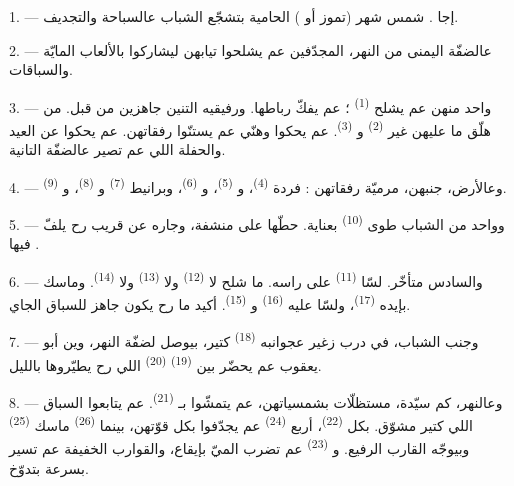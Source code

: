 \VUsaut{4.0mm}
\VUsaut{3.0mm}

\VUsaut{2.4mm}

\VUsaut{3.0mm}

1. --- إجا . شمس شهر  (تموز أو
) الحامية بتشجّع الشباب عالسباحة والتجديف.

2. --- عالضفّة اليمنى من النهر، المجدّفين عم يشلحوا تيابهن ليشاركوا
بالألعاب المايّة والسباقات.

3. --- واحد منهن عم يشلح  \textsuperscript{(1)} ؛ عم
يفكّ رباطها. ورفيقيه التنين جاهزين من قبل. من هلّق ما عليهن غير
 \textsuperscript{(2)} و
\textsuperscript{(3)}. عم يحكوا وهنّي عم يستنّوا رفقاتهن. عم يحكوا عن
العيد والحفلة اللي عم تصير عالضفّة التانية.

4. --- وعالأرض، جنبهن، مرميّة  رفقاتهن : فردة
 \textsuperscript{(4)}، و
\textsuperscript{(5)}، و \textsuperscript{(6)}،
وبرانيط  \textsuperscript{(7)} و
\textsuperscript{(8)}، و \textsuperscript{(9)}.

5. --- وواحد من الشباب طوى  \textsuperscript{(10)}
بعناية. حطّها على منشفة، وجاره عن قريب رح يلفّ فيها
.

6. --- والسادس متأخّر. لسّا  \textsuperscript{(11)}
على راسه. ما شلح لا  \textsuperscript{(12)} ولا
 \textsuperscript{(13)} ولا 
\textsuperscript{(14)}. وماسك بإيده 
\textsuperscript{(17)}، ولسّا عليه 
\textsuperscript{(16)} و \textsuperscript{(15)}.
أكيد ما رح يكون جاهز للسباق الجاي.

7. --- وجنب الشباب، في درب زغير عجوانبه 
\textsuperscript{(18)} كتير، بيوصل لضفّة النهر، وين أبو يعقوب عم يحضّر
بين  \textsuperscript{(19)} 
\textsuperscript{(20)} اللي رح يطيّروها بالليل.

\VUsaut{4.4mm}
\VUsaut{3.4mm}

8. --- وعالنهر، كم سيّدة، مستظلّات بشمسياتهن، عم يتمشّوا
بـ \textsuperscript{(21)}. عم يتابعوا السباق اللي كتير
مشوّق. بكل  \textsuperscript{(22)}، أربع 
\textsuperscript{(24)} عم يجدّفوا بكل قوّتهن، بينما 
\textsuperscript{(26)} ماسك  \textsuperscript{(25)}
وبيوجّه القارب الرفيع. و \textsuperscript{(23)} عم
تضرب الميّ بإيقاع، والقوارب الخفيفة عم تسير بسرعة بتدوّخ.

